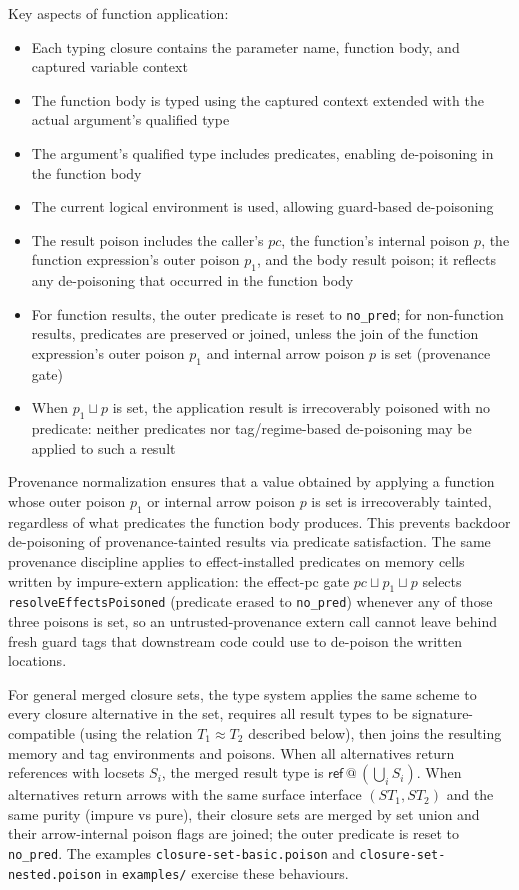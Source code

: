 \documentclass[12pt]{article}
\begin{document}
Key aspects of function application:
\begin{itemize}
    \item Each typing closure contains the parameter name, function body, and captured variable context
    \item The function body is typed using the captured context extended with the actual argument's qualified type
    \item The argument's qualified type includes predicates, enabling de-poisoning in the function body
    \item The current logical environment is used, allowing guard-based de-poisoning
    \item The result poison includes the caller's \(pc\), the function's internal poison \(p\), the function expression's outer poison \(p_1\), and the body result poison; it reflects any de-poisoning that occurred in the function body
    \item For function results, the outer predicate is reset to \texttt{no\_pred}; for non-function results, predicates are preserved or joined, unless the join of the function expression's outer poison \(p_1\) and internal arrow poison \(p\) is set (provenance gate)
    \item When \(p_1 \sqcup p\) is set, the application result is irrecoverably poisoned with no predicate: neither predicates nor tag/regime-based de-poisoning may be applied to such a result
\end{itemize}

Provenance normalization ensures that a value obtained by applying a function whose outer poison \(p_1\) or internal arrow poison \(p\) is set is irrecoverably tainted, regardless of what predicates the function body produces. This prevents backdoor de-poisoning of provenance-tainted results via predicate satisfaction. The same provenance discipline applies to effect-installed predicates on memory cells written by impure-extern application: the effect-pc gate \(\textit{pc} \sqcup p_1 \sqcup p\) selects \texttt{resolveEffectsPoisoned} (predicate erased to \texttt{no\_pred}) whenever any of those three poisons is set, so an untrusted-provenance extern call cannot leave behind fresh guard tags that downstream code could use to de-poison the written locations.

For general merged closure sets, the type system applies the same scheme to
every closure alternative in the set, requires all result types to be
signature-compatible (using the relation $T_1 \approx T_2$ described below),
then joins the resulting memory and tag environments and poisons. When all
alternatives return references with locsets $S_i$,
the merged result type is $\mathsf{ref}\,@\,(\bigcup_i S_i)$. When
alternatives return arrows with the same surface interface $(ST_1, ST_2)$ and
the same purity (impure vs pure), their closure sets are merged by set union
and their arrow-internal poison flags are joined; the outer predicate is reset
to \texttt{no\_pred}. The examples \texttt{closure-set-basic.poison} and
\texttt{closure-set-nested.poison} in \texttt{examples/} exercise these
behaviours.
\end{document}
